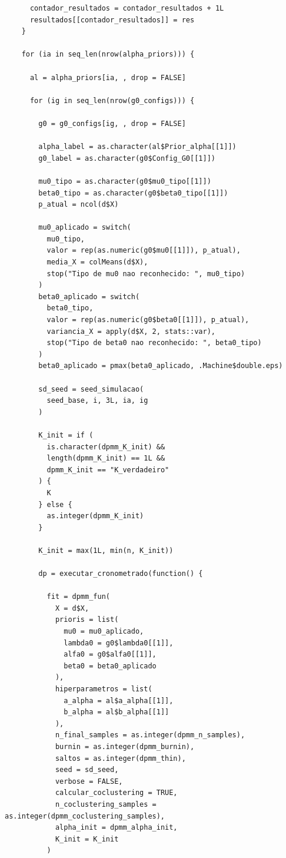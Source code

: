 \begin{verbatim}
      contador_resultados = contador_resultados + 1L
      resultados[[contador_resultados]] = res
    }
    
    for (ia in seq_len(nrow(alpha_priors))) {
      
      al = alpha_priors[ia, , drop = FALSE]
      
      for (ig in seq_len(nrow(g0_configs))) {
        
        g0 = g0_configs[ig, , drop = FALSE]
        
        alpha_label = as.character(al$Prior_alpha[[1]])
        g0_label = as.character(g0$Config_G0[[1]])
        
        mu0_tipo = as.character(g0$mu0_tipo[[1]])
        beta0_tipo = as.character(g0$beta0_tipo[[1]])
        p_atual = ncol(d$X)
        
        mu0_aplicado = switch(
          mu0_tipo,
          valor = rep(as.numeric(g0$mu0[[1]]), p_atual),
          media_X = colMeans(d$X),
          stop("Tipo de mu0 nao reconhecido: ", mu0_tipo)
        )
        beta0_aplicado = switch(
          beta0_tipo,
          valor = rep(as.numeric(g0$beta0[[1]]), p_atual),
          variancia_X = apply(d$X, 2, stats::var),
          stop("Tipo de beta0 nao reconhecido: ", beta0_tipo)
        )
        beta0_aplicado = pmax(beta0_aplicado, .Machine$double.eps)
        
        sd_seed = seed_simulacao(
          seed_base, i, 3L, ia, ig
        )
        
        K_init = if (
          is.character(dpmm_K_init) &&
          length(dpmm_K_init) == 1L &&
          dpmm_K_init == "K_verdadeiro"
        ) {
          K
        } else {
          as.integer(dpmm_K_init)
        }
        
        K_init = max(1L, min(n, K_init))
        
        dp = executar_cronometrado(function() {
          
          fit = dpmm_fun(
            X = d$X,
            prioris = list(
              mu0 = mu0_aplicado,
              lambda0 = g0$lambda0[[1]],
              alfa0 = g0$alfa0[[1]],
              beta0 = beta0_aplicado
            ),
            hiperparametros = list(
              a_alpha = al$a_alpha[[1]],
              b_alpha = al$b_alpha[[1]]
            ),
            n_final_samples = as.integer(dpmm_n_samples),
            burnin = as.integer(dpmm_burnin),
            saltos = as.integer(dpmm_thin),
            seed = sd_seed,
            verbose = FALSE,
            calcular_coclustering = TRUE,
            n_coclustering_samples = as.integer(dpmm_coclustering_samples),
            alpha_init = dpmm_alpha_init,
            K_init = K_init
          )
          

\end{verbatim}
